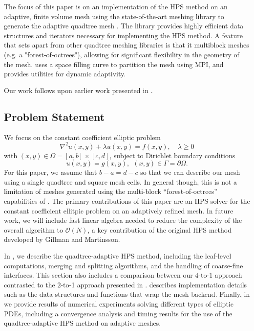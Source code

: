 The focus of this paper is on an implementation of the HPS method on an adaptive, finite volume mesh using the state-of-the-art meshing library \pforest to generate the adaptive quadtree mesh \cite{burstedde2011p4est}.  The \pforest library provides highly efficient data structures and iterators necessary for implementing the HPS method.  A feature that sets \pforest apart from other quadtree meshing libraries is that it multiblock meshes (e.g. a "forest-of-octrees"), allowing for significant flexibility in the geometry of the mesh. \pforest uses a space filling curve to partition the mesh using MPI, and provides utilities for dynamic adaptivity.   Our work follows upon earlier work presented in \cite{babb2018accelerated, geldermans2019adaptive}.


\subsection{Problem Statement}

We focus on the constant coefficient elliptic problem
\begin{equation}
    \nabla^2 u(x,y) + \lambda u(x,y) = f(x,y), \quad \lambda \ge 0
    \label{eq:elliptic_pde}
\end{equation}
with $(x,y) \in \Omega = [a, b] \times [c,d]$, subject to Dirichlet boundary conditions
\begin{equation}
    u(x,y) = g(x,y),\ \ (x,y) \in \Gamma = \partial \Omega.
\end{equation}
For this paper, we assume that $b-a=d-c$ so that we can describe our mesh using a single quadtree and square mesh cells.  In general though, this is not a limitation of meshes generated using the multi-block ``forest-of-octrees'' capabilities of \pforest.  The primary contributions of this paper are an HPS solver for the constant coefficient ellitpic problem on an adaptively refined \pforest mesh. In future work, we will include fast linear algebra needed to reduce the complexity of the overall algorithm to $\mathcal O(N)$, a key contribution of the original HPS method developed by Gillman and Martinsson.

In , we describe the quadtree-adaptive HPS method, including the leaf-level computations, merging and splitting algorithms, and the handling of coarse-fine interfaces. This section also includes a comparison between our 4-to-1 approach contrasted to the 2-to-1 approach presented in \cite{gillman2014direct}.  describes implementation details such as the data structures and functions that wrap the \pforest mesh backend. Finally, in  we provide results of numerical experiments solving different types of elliptic PDEs, including a convergence analysis and timing results for the use of the quadtree-adaptive HPS method on adaptive meshes.